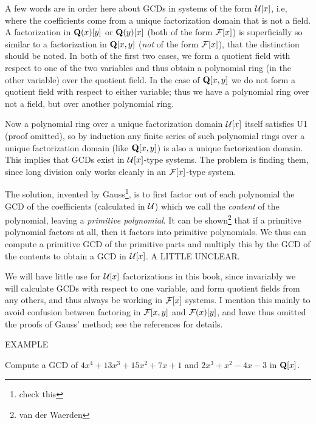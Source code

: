 A few words are in order here about GCDs in systems of the form ${\cal
U}[x]$, i.e, where the coefficients come from a unique factorization
domain that is not a field.  A factorization in ${\bf Q}(x)[y]$ or
${\bf Q}(y)[x]$ (both of the form ${\cal F}[x]$) is superficially so
similar to a factorization in ${\bf Q}[x,y]$ ({\it not} of the form
${\cal F}[x]$), that the distinction should be noted.  In both of the
first two cases, we form a quotient field with respect to one of the
two variables and thus obtain a polynomial ring (in the other
variable) over the quotient field.  In the case of ${\bf Q}[x,y]$ we
do not form a quotient field with respect to either variable; thus we
have a polynomial ring over not a field, but over another polynomial ring.

Now a polynomial ring over a unique factorization domain ${\cal U}[x]$
itself satisfies U1 (proof omitted), so by induction any finite series
of such polynomial rings over a unique factorization domain (like
${\bf Q}[x,y]$) is also a unique factorization domain.  This implies
that GCDs exist in ${\cal U}[x]$-type systems.  The problem is finding
them, since long division only works cleanly in an ${\cal F}[x]$-type
system.

The solution, invented by Gauss\footnote{check this}, is to first
factor out of each polynomial the GCD of the coefficients (calculated
in ${\cal U}$) which we call the {\it content} of the polynomial,
leaving a {\it primitive polynomial}.  It can be shown\footnote{van
der Waerden} that if a primitive polynomial factors at all, then it
factors into primitive polynomials.  We thus can compute a primitive
GCD of the primitive parts and multiply this by the GCD of the
contents to obtain a GCD in ${\cal U}[x]$.  A LITTLE UNCLEAR.

We will have little use for ${\cal U}[x]$ factorizations in this book,
since invariably we will calculate GCDs with respect to one variable,
and form quotient fields from any others, and thus always be working
in ${\cal F}[x]$ systems.  I mention this mainly to avoid confusion
between factoring in ${\cal F}[x,y]$ and ${\cal F}(x)[y]$, and have
thus omitted the proofs of Gauss' method; see the references for
details.

\vfill\eject

EXAMPLE

Compute a GCD of $4x^4+13x^3+15x^2+7x+1$ and $2x^3+x^2-4x-3$ in ${\bf Q}[x]$.

\bigskip


